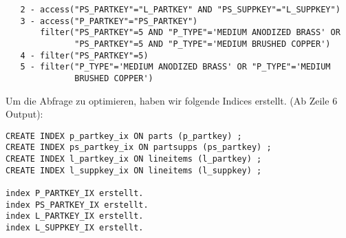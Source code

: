 \documentclass[11pt,a4paper,parskip=half]{scrartcl}
\begin{document}
\begin{lstlisting}
   2 - access("PS_PARTKEY"="L_PARTKEY" AND "PS_SUPPKEY"="L_SUPPKEY")                                                                                                                                                                                                                                         
   3 - access("P_PARTKEY"="PS_PARTKEY")                                                                                                                                                                                                                                                                      
       filter("PS_PARTKEY"=5 AND "P_TYPE"='MEDIUM ANODIZED BRASS' OR                                                                                                                                                                                                                                         
              "PS_PARTKEY"=5 AND "P_TYPE"='MEDIUM BRUSHED COPPER')                                                                                                                                                                                                                                           
   4 - filter("PS_PARTKEY"=5)                                                                                                                                                                                                                                                                                
   5 - filter("P_TYPE"='MEDIUM ANODIZED BRASS' OR "P_TYPE"='MEDIUM                                                                                                                                                                                                                                           
              BRUSHED COPPER')                                                                                                                                                                                                                                                                               
\end{lstlisting}

Um die Abfrage zu optimieren, haben wir folgende Indices erstellt. (Ab Zeile 6 Output):
\begin{lstlisting}
CREATE INDEX p_partkey_ix ON parts (p_partkey) ;
CREATE INDEX ps_partkey_ix ON partsupps (ps_partkey) ;
CREATE INDEX l_partkey_ix ON lineitems (l_partkey) ;
CREATE INDEX l_suppkey_ix ON lineitems (l_suppkey) ;

index P_PARTKEY_IX erstellt.
index PS_PARTKEY_IX erstellt.
index L_PARTKEY_IX erstellt.
index L_SUPPKEY_IX erstellt.
\end{lstlisting}
\end{document}
